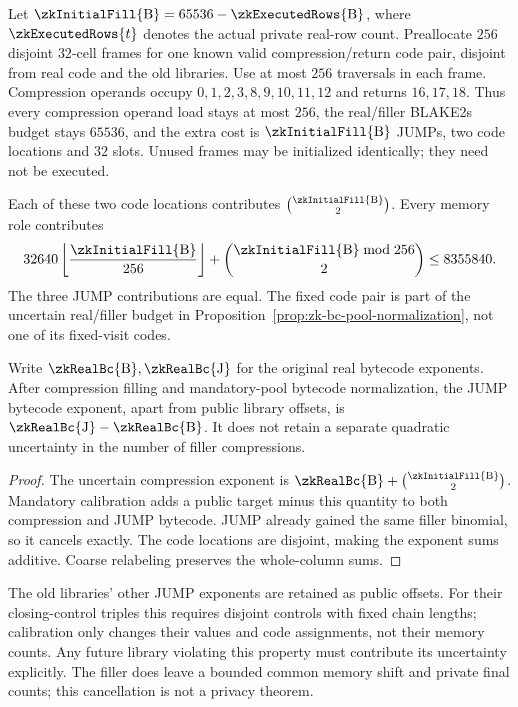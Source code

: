Let $\zkInitialFill{\mathrm B}=65536-\zkExecutedRows{\mathrm B}$, where $\zkExecutedRows{t}$ denotes the actual private real-row count. Preallocate $256$ disjoint $32$-cell frames for one known valid compression/return code pair, disjoint from real code and the old libraries. Use at most $256$ traversals in each frame. Compression operands occupy $0,1,2,3,8,9,10,11,12$ and returns $16,17,18$. Thus every compression operand load stays at most $256$, the real/filler BLAKE2s budget stays $65536$, and the extra cost is $\zkInitialFill{\mathrm B}$ JUMPs, two code locations and $32$ slots. Unused frames may be initialized identically; they need not be executed.

Each of these two code locations contributes $\binom{\zkInitialFill{\mathrm B}}2$. Every memory role contributes
\[
 32640\left\lfloor\frac{\zkInitialFill{\mathrm B}}{256}\right\rfloor
 +\binom{\zkInitialFill{\mathrm B}\bmod256}{2}
 \le8355840.
\]
The three JUMP contributions are equal. The fixed code pair is part of the uncertain real/filler budget in Proposition~\ref{prop:zk-bc-pool-normalization}, not one of its fixed-visit codes.

\begin{lemma}\label{lem:zk-compression-fill-cancellation}
Write $\zkRealBc{\mathrm B},\zkRealBc{\mathrm J}$ for the original real bytecode exponents. After compression filling and mandatory-pool bytecode normalization, the JUMP bytecode exponent, apart from public library offsets, is $\zkRealBc{\mathrm J}-\zkRealBc{\mathrm B}$. It does not retain a separate quadratic uncertainty in the number of filler compressions.
\end{lemma}
\begin{proof}
The uncertain compression exponent is $\zkRealBc{\mathrm B}+\binom{\zkInitialFill{\mathrm B}}2$. Mandatory calibration adds a public target minus this quantity to both compression and JUMP bytecode. JUMP already gained the same filler binomial, so it cancels exactly. The code locations are disjoint, making the exponent sums additive. Coarse relabeling preserves the whole-column sums.
\end{proof}

The old libraries' other JUMP exponents are retained as public offsets. For their closing-control triples this requires disjoint controls with fixed chain lengths; calibration only changes their values and code assignments, not their memory counts. Any future library violating this property must contribute its uncertainty explicitly. The filler does leave a bounded common memory shift and private final counts; this cancellation is not a privacy theorem.

